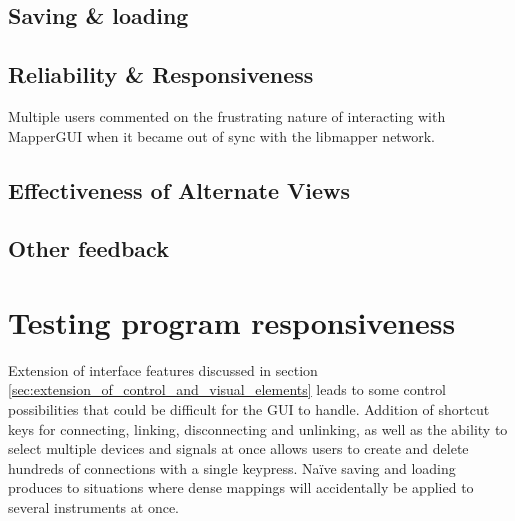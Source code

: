 
	\subsection{Saving \& loading} %
	\label{sub:saving_and_loading}
	

	\subsection{Reliability \& Responsiveness} %
	\label{sub:reliability_and_responsiveness}

Multiple users commented on the frustrating nature of interacting with MapperGUI when it became out of sync with the libmapper network.
	

	\subsection{Effectiveness of Alternate Views} %
	\label{sub:effectiveness_of_alternate_views}
	

	\subsection{Other feedback} %
	\label{sub:other_feedback}
	
	

\section{Testing program responsiveness} %
\label{sec:testing_program_responsiveness}

Extension of interface features discussed in section \ref{sec:extension_of_control_and_visual_elements} leads to some control possibilities that could be difficult for the GUI to handle. Addition of shortcut keys for connecting, linking, disconnecting and unlinking, as well as the ability to select multiple devices and signals at once allows users to create and delete hundreds of connections with a single keypress. Na\"{i}ve saving and loading produces to situations where dense mappings will accidentally be applied to several instruments at once.

